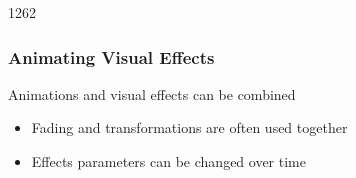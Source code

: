 
\begin{slide}{1262}\frametitle{Animating Visual Effects}

Animations and visual effects can be combined

\begin{itemize}
\item Fading and transformations are often used together
\item Effects parameters can be changed over time
\end{itemize}

\end{slide}
